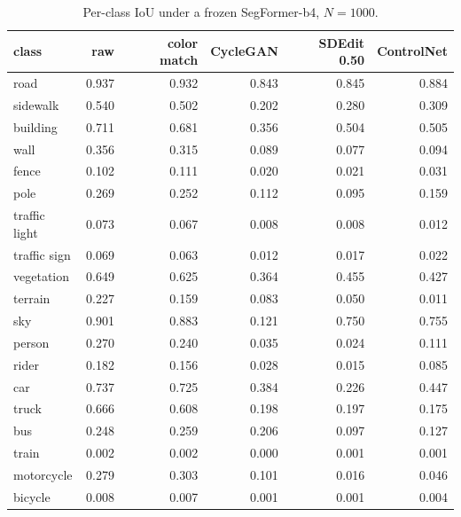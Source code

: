 \begin{table}[h]
\centering
\caption{Per-class IoU under a frozen SegFormer-b4, $N{=}1000$.}
\label{tab:perclass-full}
\begin{tabular}{lrrrrr}
\toprule
class & raw & color match & CycleGAN & SDEdit 0.50 & ControlNet \\
\midrule
road & 0.937 & 0.932 & 0.843 & 0.845 & 0.884 \\
sidewalk & 0.540 & 0.502 & 0.202 & 0.280 & 0.309 \\
building & 0.711 & 0.681 & 0.356 & 0.504 & 0.505 \\
wall & 0.356 & 0.315 & 0.089 & 0.077 & 0.094 \\
fence & 0.102 & 0.111 & 0.020 & 0.021 & 0.031 \\
pole & 0.269 & 0.252 & 0.112 & 0.095 & 0.159 \\
traffic light & 0.073 & 0.067 & 0.008 & 0.008 & 0.012 \\
traffic sign & 0.069 & 0.063 & 0.012 & 0.017 & 0.022 \\
vegetation & 0.649 & 0.625 & 0.364 & 0.455 & 0.427 \\
terrain & 0.227 & 0.159 & 0.083 & 0.050 & 0.011 \\
sky & 0.901 & 0.883 & 0.121 & 0.750 & 0.755 \\
person & 0.270 & 0.240 & 0.035 & 0.024 & 0.111 \\
rider & 0.182 & 0.156 & 0.028 & 0.015 & 0.085 \\
car & 0.737 & 0.725 & 0.384 & 0.226 & 0.447 \\
truck & 0.666 & 0.608 & 0.198 & 0.197 & 0.175 \\
bus & 0.248 & 0.259 & 0.206 & 0.097 & 0.127 \\
train & 0.002 & 0.002 & 0.000 & 0.001 & 0.001 \\
motorcycle & 0.279 & 0.303 & 0.101 & 0.016 & 0.046 \\
bicycle & 0.008 & 0.007 & 0.001 & 0.001 & 0.004 \\
\bottomrule
\end{tabular}
\end{table}

